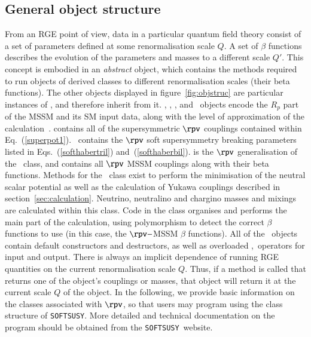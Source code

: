 \documentclass[final,3p,times,pdflatex]{elsarticle}
\def\SOFTSUSY{{\tt SOFTSUSY}}
\begin{document}
\subsection{General object structure}

From an RGE point of view, data in a particular quantum field theory 
consist of a set of parameters defined at some
renormalisation scale $Q$. 
A set of $\beta$ functions describes the
evolution of the parameters and masses to a different scale
$Q'$. This concept is embodied in an {\em abstract} 
object, which contains the methods required to run objects of derived
classes to different renormalisation scales (their beta functions). The other
objects 
displayed in figure~\ref{fig:objstruc} are particular instances of
, and therefore inherit from it. , ,
,  and ~objects encode the
$R_p$ part of the 
MSSM and its SM input data, along with the level of approximation of the calculation~\cite{Allanach:2001kg}. 
 contains all of the supersymmetric $\rpv$ couplings contained
within  Eq.~(\ref{superpot1}). 
~contains the $\rpv$ soft supersymmetry breaking parameters
listed in 
Eqs.~(\ref{softhabertril}) and~(\ref{softhaberbil}).  is
the $\rpv$  
generalisation of the ~class, and contains all $\rpv$ MSSM
couplings along with their beta functions.
Methods for the ~class exist to perform the minimisation of
the neutral scalar potential as well as the
calculation of Yukawa couplings described in section~\ref{sec:calculation}. 
Neutrino, neutralino and chargino masses and mixings are calculated within
this class. 
Code in
the  class organises and performs the main part of
the calculation, using polymorphism to detect the correct $\beta$ functions to
use (in this case, the $\rpv-$MSSM $\beta$ functions). 
All of the ~objects contain default constructors
and destructors, as well as overloaded \code{>>},\code{<<}~operators for input
and output. 
There is always an implicit dependence of running RGE quantities on the
current renormalisation scale $Q$. Thus, if a method is called that returns
one of the object's couplings or masses, that object will return it at the
current scale $Q$ of the object. 
In the following, we provide basic information on the 
classes associated with $\rpv$, so that users may program using the class
structure of \SOFTSUSY\@. More detailed and
technical documentation on the program should be obtained from the
\SOFTSUSY~website. 
\end{document}
